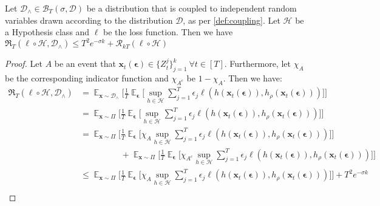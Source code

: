 \begin{lemma}
Let $\mathcal{D}_\wedge \in \mathcal{B}_T (\sigma, \mathcal{D})$ be a distribution that is coupled to independent random variables drawn according to the distribution $\mathcal{D}$, as per \cref{def:coupling}. Let $\mathcal{H}$ be a Hypothesis class and $\ell$ be the loss function. Then we have $\mathfrak{R}_T (\ell \circ \mathcal{H}, \mathcal{D}_\wedge) \leq T^2 e^{-\sigma k} + \mathcal{R}_{kT} (\ell \circ \mathcal{H})$
\end{lemma}
\begin{proof}
Let $A$ be an event that $\mathbf{x}_t (\boldsymbol{\epsilon}) \in \{ Z_t^j \}_{j=1}^k \ \forall t \in [T]$. Furthermore, let $\chi_A$ be the corresponding indicator function and $\chi_{A^c}$ be $1-\chi_A$. Then we have:
\begin{align}
\label{eq:rad_comp_ubound}
    \mathfrak{R}_T (\ell \circ \mathcal{H}, \mathcal{D}_\wedge) &= \mathop{\mathbb{E}}_{\mathbf{x} \sim \mathcal{D}_\wedge} \Big[\frac{1}{T} \mathop{\mathbb{E}}_{\boldsymbol{\epsilon}} \Big[ \sup_{h \in \mathcal{H}} \sum_{j=1}^T \epsilon_j \ell (h(\mathbf{x}_t(\boldsymbol{\epsilon})), h_\rho (\mathbf{x}_t(\boldsymbol{\epsilon}))) \Big] \Big] \nonumber \\
    &= \mathop{\mathbb{E}}_{\mathbf{x} \sim \Pi} \Big[\frac{1}{T} \mathop{\mathbb{E}}_{\boldsymbol{\epsilon}} \Big[ \sup_{h \in \mathcal{H}} \sum_{j=1}^T \epsilon_j \ell (h(\mathbf{x}_t(\boldsymbol{\epsilon})), h_\rho (\mathbf{x}_t(\boldsymbol{\epsilon}))) \Big] \Big] \nonumber \\
    &= \mathop{\mathbb{E}}_{\mathbf{x} \sim \Pi} \Big[\frac{1}{T} \mathop{\mathbb{E}}_{\boldsymbol{\epsilon}} \Big[ \chi_A \sup_{h \in \mathcal{H}} \sum_{j=1}^T \epsilon_j \ell (h(\mathbf{x}_t(\boldsymbol{\epsilon})), h_\rho (\mathbf{x}_t(\boldsymbol{\epsilon}))) \Big] \Big] \nonumber \\ 
    &\hspace{2cm}+ \mathop{\mathbb{E}}_{\mathbf{x} \sim \Pi} \Big[\frac{1}{T} \mathop{\mathbb{E}}_{\boldsymbol{\epsilon}} \Big[ \chi_{A^c} \sup_{h \in \mathcal{H}} \sum_{j=1}^T \epsilon_j \ell (h(\mathbf{x}_t(\boldsymbol{\epsilon})), h_\rho (\mathbf{x}_t(\boldsymbol{\epsilon}))) \Big] \Big] \nonumber \\
    &\leq \mathop{\mathbb{E}}_{\mathbf{x} \sim \Pi} \Big[\frac{1}{T} \mathop{\mathbb{E}}_{\boldsymbol{\epsilon}} \Big[ \chi_A \sup_{h \in \mathcal{H}} \sum_{j=1}^T \epsilon_j \ell (h(\mathbf{x}_t(\boldsymbol{\epsilon})), h_\rho (\mathbf{x}_t(\boldsymbol{\epsilon}))) \Big] \Big] + T^2 e^{-\sigma k} \nonumber \\

\end{align}
\end{proof}
